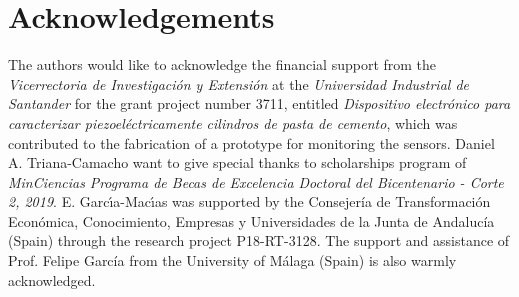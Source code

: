 \documentclass[a4paper,fleqn]{cas-sc}
\begin{document}

\section*{Acknowledgements}
The authors would like to acknowledge the financial support from the \textit{Vicerrectoria de Investigación y Extensión} at the \textit{Universidad Industrial de Santander} for the grant project number 3711, entitled \textit{Dispositivo electrónico para caracterizar piezoeléctricamente cilindros de pasta de cemento}, which was contributed to the fabrication of a prototype for monitoring the sensors. Daniel A. Triana-Camacho want to give special thanks to scholarships program of \textit{MinCiencias} \textit{Programa de Becas de Excelencia Doctoral del Bicentenario - Corte 2, 2019}. E. Garc\'{\i}a-Mac\'{\i}as was supported by the Consejería de Transformación Económica, Conocimiento, Empresas y Universidades de la Junta de Andalucía (Spain) through the research project P18-RT-3128. The support and assistance of Prof. Felipe García from the University of Málaga (Spain) is also warmly acknowledged.

%
%



\end{document}
